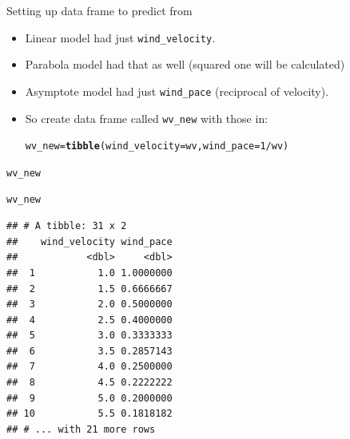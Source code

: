 \documentclass[unknownkeysallowed]{beamer}\usepackage[]{graphicx}\usepackage[]{color}
\makeatletter
\newcommand{\hlnum}[1]{\textcolor[rgb]{0.686,0.059,0.569}{#1}}%
\newcommand{\hlopt}[1]{\textcolor[rgb]{0,0,0}{#1}}%
\newcommand{\hlstd}[1]{\textcolor[rgb]{0.345,0.345,0.345}{#1}}%
\newcommand{\hlkwb}[1]{\textcolor[rgb]{0.69,0.353,0.396}{#1}}%
\newcommand{\hlkwc}[1]{\textcolor[rgb]{0.333,0.667,0.333}{#1}}%
\newcommand{\hlkwd}[1]{\textcolor[rgb]{0.737,0.353,0.396}{\textbf{#1}}}%
\newenvironment{kframe}{%
 \def\at@end@of@kframe{}%
 \ifinner\ifhmode%
  \def\at@end@of@kframe{\end{minipage}}%
  \begin{minipage}{\columnwidth}%
 \fi\fi%
 \def\FrameCommand##1{\hskip\@totalleftmargin \hskip-\fboxsep
 \colorbox{shadecolor}{##1}\hskip-\fboxsep
     \hskip-\linewidth \hskip-\@totalleftmargin \hskip\columnwidth}%
 \MakeFramed {\advance\hsize-\width
   \@totalleftmargin\z@ \linewidth\hsize
   \@setminipage}}%
 {\par\unskip\endMakeFramed%
 \at@end@of@kframe}
\newenvironment{knitrout}{}{} %
\makeatother
\begin{document}
\begin{frame}[fragile]{Setting up data frame to predict from}
  
  \begin{itemize}
  \item Linear model had just \texttt{wind\_velocity}.
  \item Parabola model had that as well (squared one will be calculated)
  \item Asymptote model had just \texttt{wind\_pace} (reciprocal of
    velocity).
  \item So create data frame called \texttt{wv\_new} with those in:
\begin{knitrout}
\color{fgcolor}\begin{kframe}
\begin{alltt}
\hlstd{wv_new}\hlkwb{=}\hlkwd{tibble}\hlstd{(}\hlkwc{wind_velocity}\hlstd{=wv,} \hlkwc{wind_pace}\hlstd{=}\hlnum{1}\hlopt{/}\hlstd{wv)}
\end{alltt}
\end{kframe}
\end{knitrout}
  \end{itemize}
  
\end{frame}

\begin{frame}[fragile]{\texttt{wv\_new}}
  
\begin{knitrout}
\color{fgcolor}\begin{kframe}
\begin{alltt}
\hlstd{wv_new}
\end{alltt}
\begin{verbatim}
## # A tibble: 31 x 2
##    wind_velocity wind_pace
##            <dbl>     <dbl>
##  1           1.0 1.0000000
##  2           1.5 0.6666667
##  3           2.0 0.5000000
##  4           2.5 0.4000000
##  5           3.0 0.3333333
##  6           3.5 0.2857143
##  7           4.0 0.2500000
##  8           4.5 0.2222222
##  9           5.0 0.2000000
## 10           5.5 0.1818182
## # ... with 21 more rows
\end{verbatim}
\end{kframe}
\end{knitrout}
  
\end{frame}
\end{document}
